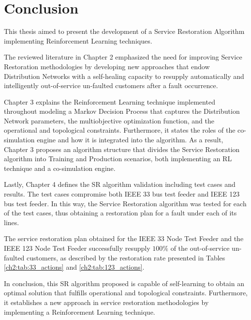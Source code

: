 \section{Conclusion}
\label{ch-conclusions:sec:conclusion}


This thesis aimed to present the development of a Service Restoration Algorithm implementing Reinforcement Learning techniques.

The reviewed literature in Chapter 2 emphasized the need for improving Service Restoration methodologies by developing new approaches that endow Distribution Networks with a self-healing capacity to resupply automatically and intelligently out-of-service un-faulted customers after a fault occurrence.  

Chapter 3 explains the Reinforcement Learning technique implemented throughout modeling a Markov Decision Process that captures the Distribution Network parameters, the multiobjective optimization function, and the operational and topological constraints. Furthermore, it states the roles of the co-simulation engine and how it is integrated into the algorithm. As a result, Chapter 3 proposes an algorithm structure that divides the Service Restoration algorithm into Training and Production scenarios, both implementing an RL technique and a co-simulation engine.  

Lastly, Chapter 4 defines the SR algorithm validation including test cases and results. The test cases compromise both IEEE 33 bus test feeder and IEEE 123 bus test feeder. In this way, the Service Restoration algorithm was tested for each of the test cases, thus obtaining a restoration plan for a fault under each of its lines. 

The service restoration plan obtained for the IEEE 33 Node Test Feeder and the IEEE 123 Node Test Feeder successfully resupply $100\%$ of the out-of-service un-faulted customers, as described by the restoration rate presented in Tables \ref{ch2:tab:33_actions} and \ref{ch2:tab:123_actions}.


In conclusion, this SR algorithm proposed is capable of self-learning to obtain an optimal solution that fulfills operational and topological constraints. Furthermore, it establishes a new approach in service restoration methodologies by implementing a Reinforcement Learning technique.